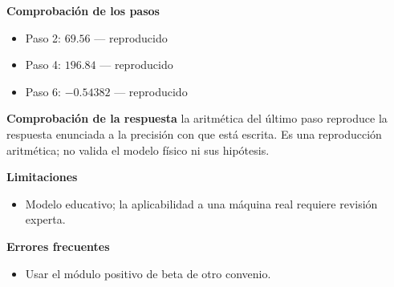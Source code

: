 \documentclass[10pt,openany]{book}
\begin{document}
\begin{tcolorbox}[title={Problema resuelto 2}, studiumworked, breakable]
\noindent\textbf{Comprobación de los pasos}
\begin{itemize}
\item Paso 2: $69.56$ — reproducido
\item Paso 4: $196.84$ — reproducido
\item Paso 6: $-0.54382$ — reproducido
\end{itemize}

\noindent\textbf{Comprobación de la respuesta} la aritmética del último paso reproduce la respuesta enunciada a la precisión con que está escrita. Es una reproducción aritmética; no valida el modelo físico ni sus hipótesis.

\noindent\textbf{Limitaciones}
\begin{itemize}
\item Modelo educativo; la aplicabilidad a una máquina real requiere revisión experta.
\end{itemize}

\noindent\textbf{Errores frecuentes}
\begin{itemize}
\item Usar el módulo positivo de beta de otro convenio.
\end{itemize}
\end{tcolorbox}
\end{document}
